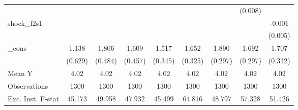 {\begin{tabular}{l*{8}{c}}
            &                     &                     &                     &                     &                     &                     &     (0.008)         &                     \\
\addlinespace
shock\_f2s1  &                     &                     &                     &                     &                     &                     &                     &      -0.001         \\
            &                     &                     &                     &                     &                     &                     &                     &     (0.005)         \\
\addlinespace
\_cons      &       1.138\sym{*}  &       1.806\sym{***}&       1.609\sym{***}&       1.517\sym{***}&       1.652\sym{***}&       1.890\sym{***}&       1.692\sym{***}&       1.707\sym{***}\\
            &     (0.629)         &     (0.484)         &     (0.457)         &     (0.345)         &     (0.325)         &     (0.297)         &     (0.297)         &     (0.312)         \\
\midrule
Mean Y      &        4.02         &        4.02         &        4.02         &        4.02         &        4.02         &        4.02         &        4.02         &        4.02         \\
Observations&        1300         &        1300         &        1300         &        1300         &        1300         &        1300         &        1300         &        1300         \\
Exc. Inst. F-stat&      45.173         &      49.958         &      47.932         &      45.499         &      64.816         &      48.797         &      57.328         &      51.426         \\
\bottomrule
\end{tabular}
}
